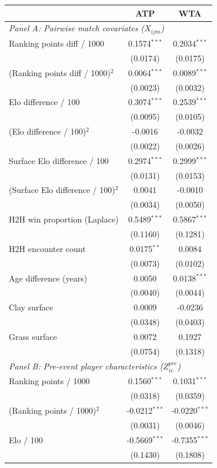 \begin{tabular}{lcc}
\toprule
 & ATP & WTA \\
\midrule
\multicolumn{3}{l}{\textit{Panel A: Pairwise match covariates ($X_{ijm}$)}} \\
Ranking points diff / 1000 & 0.1574$^{***}$ & 0.2034$^{***}$ \\
 & (0.0174) & (0.0175) \\
(Ranking points diff / 1000)$^2$ & 0.0064$^{***}$ & 0.0089$^{***}$ \\
 & (0.0023) & (0.0032) \\
Elo difference / 100 & 0.3074$^{***}$ & 0.2539$^{***}$ \\
 & (0.0095) & (0.0105) \\
(Elo difference / 100)$^2$ & -0.0016 & -0.0032 \\
 & (0.0022) & (0.0026) \\
Surface Elo difference / 100 & 0.2974$^{***}$ & 0.2999$^{***}$ \\
 & (0.0131) & (0.0153) \\
(Surface Elo difference / 100)$^2$ & 0.0041 & -0.0010 \\
 & (0.0034) & (0.0050) \\
H2H win proportion (Laplace) & 0.5489$^{***}$ & 0.5867$^{***}$ \\
 & (0.1160) & (0.1281) \\
H2H encounter count & 0.0175$^{**}$ & 0.0084 \\
 & (0.0073) & (0.0102) \\
Age difference (years) & 0.0050 & 0.0138$^{***}$ \\
 & (0.0040) & (0.0044) \\
Clay surface & 0.0009 & -0.0236 \\
 & (0.0348) & (0.0403) \\
Grass surface & 0.0072 & 0.1927 \\
 & (0.0754) & (0.1318) \\
\midrule
\multicolumn{3}{l}{\textit{Panel B: Pre-event player characteristics ($Z^{pre}_{ie}$)}} \\
Ranking points / 1000 & 0.1560$^{***}$ & 0.1031$^{***}$ \\
 & (0.0318) & (0.0359) \\
(Ranking points / 1000)$^2$ & -0.0212$^{***}$ & -0.0220$^{***}$ \\
 & (0.0031) & (0.0046) \\
Elo / 100 & -0.5669$^{***}$ & -0.7355$^{***}$ \\
 & (0.1430) & (0.1808) \\

\end{tabular}
